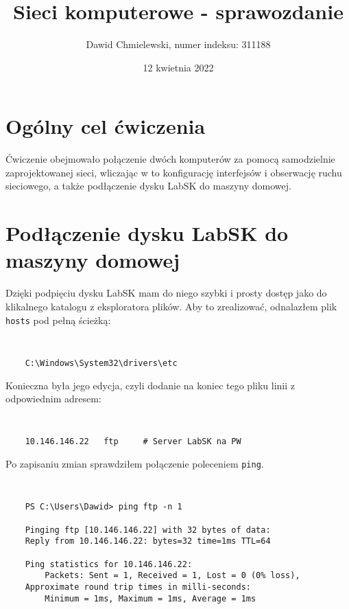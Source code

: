 \documentclass[a4paper,11pt]{article}
\begin{document}
\title{ Sieci komputerowe - sprawozdanie }
\author{ Dawid Chmielewski, numer indeksu: 311188 }
\date{12 kwietnia 2022}


\section{Ogólny cel ćwiczenia}

Ćwiczenie obejmowało połączenie dwóch komputerów za pomocą samodzielnie zaprojektowanej sieci, wliczając w to konfigurację interfejsów i obserwację ruchu sieciowego, a także podłączenie dysku LabSK do maszyny domowej.

\section{Podłączenie dysku LabSK do maszyny domowej}

Dzięki podpięciu dysku LabSK mam do niego szybki i prosty dostęp jako do klikalnego katalogu z eksploratora plików. Aby to zrealizować, odnalazłem plik {\tt hosts} pod pełną ścieżką:

{\tt
\begin{verbatim}
    C:\Windows\System32\drivers\etc
\end{verbatim}
}

Konieczna była jego edycja, czyli dodanie na koniec tego pliku linii z odpowiednim adresem:

{\tt
\begin{verbatim}
    10.146.146.22   ftp     # Server LabSK na PW
\end{verbatim}
}

Po zapisaniu zmian sprawdziłem połączenie poleceniem {\tt ping}.

{\tt
\begin{verbatim}
    PS C:\Users\Dawid> ping ftp -n 1

    Pinging ftp [10.146.146.22] with 32 bytes of data:
    Reply from 10.146.146.22: bytes=32 time=1ms TTL=64

    Ping statistics for 10.146.146.22:
        Packets: Sent = 1, Received = 1, Lost = 0 (0% loss),
    Approximate round trip times in milli-seconds:
        Minimum = 1ms, Maximum = 1ms, Average = 1ms
\end{verbatim}
}
\end{document}
